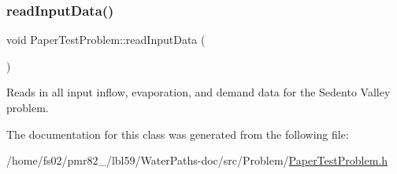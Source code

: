 \mbox{\label{classPaperTestProblem_ae4bcc17d6ceab628f88174306d54fdc9}} 
\subsubsection{\texorpdfstring{read\+Input\+Data()}{readInputData()}}
{\footnotesize\ttfamily void Paper\+Test\+Problem\+::read\+Input\+Data (\begin{DoxyParamCaption}{ }\end{DoxyParamCaption})}



Reads in all input inflow, evaporation, and demand data for the Sedento Valley problem. 



The documentation for this class was generated from the following file\+:\begin{DoxyCompactItemize}
\item 
/home/fs02/pmr82\+\_/lbl59/\+Water\+Paths-\/doc/src/\+Problem/\mbox{\hyperlink{PaperTestProblem_8h}{Paper\+Test\+Problem.\+h}}\end{DoxyCompactItemize}
